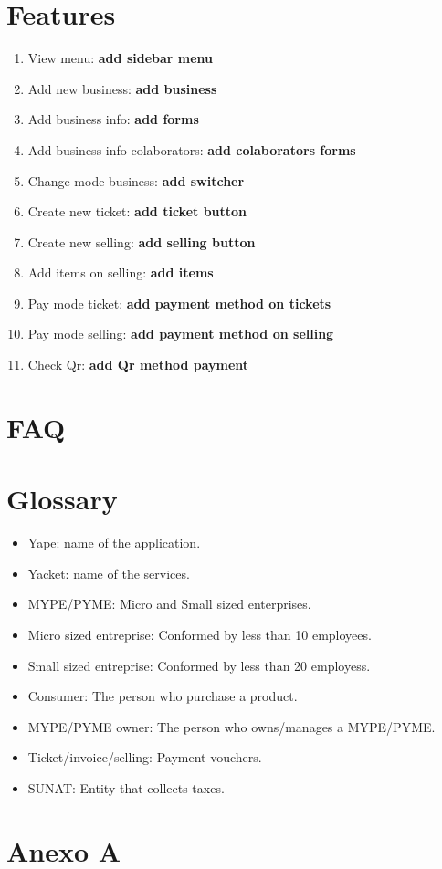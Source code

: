 \documentclass{article}
\begin{document}
\section{Features}
\begin{enumerate}
    \begin{enumerate}
        \item View menu: \textbf{add sidebar menu}
        \item Add new business: \textbf{add business}
        \item Add business info: \textbf{add forms}
        \item Add business info colaborators: \textbf{add colaborators forms}
        \item Change mode business: \textbf{add switcher}
        \item Create new ticket: \textbf{add ticket button}
        \item Create new selling: \textbf{add selling button}
        \item Add items on selling: \textbf{add items}
        \item Pay mode ticket: \textbf{add payment method on tickets}
        \item Pay mode selling: \textbf{add payment method on selling}
        \item Check Qr: \textbf{add Qr method payment}
    \end{enumerate}
\end{enumerate}


\section{FAQ}

\section{Glossary}

\begin{itemize}
    \item Yape: name of the application.
    \item Yacket: name of the services.
    \item MYPE/PYME: Micro and Small sized enterprises.
    \item Micro sized entreprise: Conformed by less than 10 employees.
    \item Small sized entreprise: Conformed by less than 20 employess.
    \item Consumer: The person who purchase a product.
    \item MYPE/PYME owner: The person who owns/manages a MYPE/PYME.
    \item Ticket/invoice/selling: Payment vouchers.
    \item SUNAT: Entity that collects taxes.
\end{itemize}


\section{Anexo A}
\end{document}
